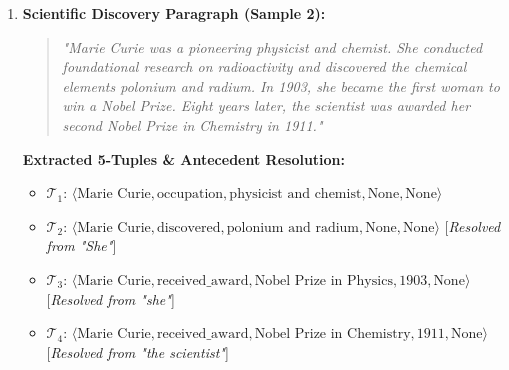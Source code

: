 \begin{enumerate}
    \item \textbf{Scientific Discovery Paragraph (Sample 2):}
    \begin{quote}
        \textit{"Marie Curie was a pioneering physicist and chemist. She conducted foundational research on radioactivity and discovered the chemical elements polonium and radium. In 1903, she became the first woman to win a Nobel Prize. Eight years later, the scientist was awarded her second Nobel Prize in Chemistry in 1911."}
    \end{quote}
    \textbf{Extracted 5-Tuples \& Antecedent Resolution:}
    \begin{itemize}
        \item $\mathcal{T}_1$: $\langle \text{Marie Curie}, \text{occupation}, \text{physicist and chemist}, \text{None}, \text{None} \rangle$
        \item $\mathcal{T}_2$: $\langle \text{Marie Curie}, \text{discovered}, \text{polonium and radium}, \text{None}, \text{None} \rangle$ \hfill [\textit{Resolved from "She"}]
        \item $\mathcal{T}_3$: $\langle \text{Marie Curie}, \text{received\_award}, \text{Nobel Prize in Physics}, \text{1903}, \text{None} \rangle$ \hfill [\textit{Resolved from "she"}]
        \item $\mathcal{T}_4$: $\langle \text{Marie Curie}, \text{received\_award}, \text{Nobel Prize in Chemistry}, \text{1911}, \text{None} \rangle$ \hfill [\textit{Resolved from "the scientist"}]
    \end{itemize}
\end{enumerate}
